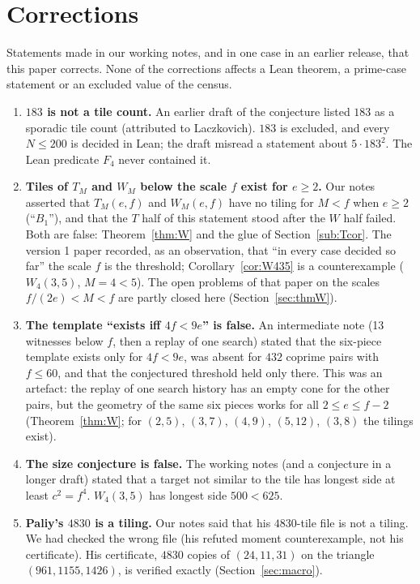 \documentclass[11pt,reqno]{amsart}
\theoremstyle{plain}
\theoremstyle{definition}
\begin{document}
\section{Corrections}\label{sec:corr}
Statements made in our working notes, and in one case in an earlier release, that this paper corrects. None of the corrections affects a Lean theorem, a prime-case statement or an excluded value of the census.
\begin{enumerate}
\item \textbf{$183$ is not a tile count.} An earlier draft of the conjecture listed $183$ as a sporadic tile count (attributed to Laczkovich). $183$ is excluded, and every $N\le200$ is decided in Lean; the draft misread a statement about $5\cdot183^2$. The Lean predicate $F_4$ never contained it.
\item \textbf{Tiles of $T_M$ and $W_M$ below the scale $f$ exist for $e\ge2$.} Our notes asserted that $T_M(e,f)$ and $W_M(e,f)$ have no tiling for $M<f$ when $e\ge2$ (``$B_1$''), and that the $T$ half of this statement stood after the $W$ half failed. Both are false: Theorem~\ref{thm:W} and the glue of Section~\ref{sub:Tcor}. The version 1 paper \cite{ReleasePaper} recorded, as an observation, that ``in every case decided so far'' the scale $f$ is the threshold; Corollary~\ref{cor:W435} is a counterexample ($W_4(3,5)$, $M=4<5$). The open problems of that paper on the scales $f/(2e)<M<f$ are partly closed here (Section~\ref{sec:thmW}).
\item \textbf{The template ``exists iff $4f<9e$'' is false.} An intermediate note (13 witnesses below $f$, then a replay of one search) stated that the six-piece template exists only for $4f<9e$, was absent for $432$ coprime pairs with $f\le60$, and that the conjectured threshold held only there. This was an artefact: the replay of one search history has an empty cone for the other pairs, but the geometry of the same six pieces works for all $2\le e\le f-2$ (Theorem~\ref{thm:W}; for $(2,5)$, $(3,7)$, $(4,9)$, $(5,12)$, $(3,8)$ the tilings exist).
\item \textbf{The size conjecture is false.} The working notes (and a conjecture in a longer draft) stated that a target not similar to the tile has longest side at least $c^2=f^4$. $W_4(3,5)$ has longest side $500<625$.
\item \textbf{Paliy's $4830$ is a tiling.} Our notes said that his $4830$-tile file is not a tiling. We had checked the wrong file (his refuted moment counterexample, not his certificate). His certificate, $4830$ copies of $(24,11,31)$ on the triangle $(961,1155,1426)$, is verified exactly (Section~\ref{sec:macro}).

\end{enumerate}
\end{document}
